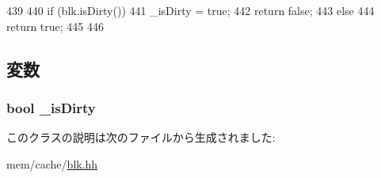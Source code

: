 \begin{DoxyCode}
439                                   {
440         if (blk.isDirty()) {
441             _isDirty = true;
442             return false;
443         } else {
444             return true;
445         }
446     }
\end{DoxyCode}


\subsection{変数}
\hypertarget{classCacheBlkIsDirtyVisitor_ab67cbd644e8217ff651799d99e971594}{
\subsubsection[{\_\-isDirty}]{\setlength{\rightskip}{0pt plus 5cm}bool {\bf \_\-isDirty}}}
\label{classCacheBlkIsDirtyVisitor_ab67cbd644e8217ff651799d99e971594}


このクラスの説明は次のファイルから生成されました:\begin{DoxyCompactItemize}
\item 
mem/cache/\hyperlink{blk_8hh}{blk.hh}\end{DoxyCompactItemize}
